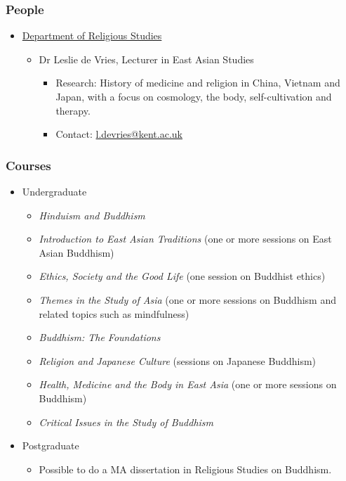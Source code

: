 \documentclass[11pt]{article}
\begin{document}
\subsubsection*{People}
\label{sec:orgacb9ae2}
\begin{itemize}
\item \href{https://www.kent.ac.uk/religious-studies/}{Department of Religious Studies}
\label{sec:org237601c}
\begin{itemize}
\item Dr Leslie de Vries, Lecturer in East Asian Studies
\label{sec:orgf307879}
\begin{itemize}
\item Research: History of medicine and religion in China, Vietnam and Japan, with a focus on cosmology, the body, self-cultivation and therapy.\\
\item Contact: \href{mailto:l.devries@kent.ac.uk}{l.devries@kent.ac.uk}\\
\end{itemize}
\end{itemize}
\end{itemize}
\subsubsection*{Courses}
\label{sec:orgd78de2b}
\begin{itemize}
\item Undergraduate
\label{sec:org9d20733}
\begin{itemize}
\item \emph{Hinduism and Buddhism}\\
\item \emph{Introduction to East Asian Traditions} (one or more sessions on East Asian Buddhism)\\
\item \emph{Ethics, Society and the Good Life} (one session on Buddhist ethics)\\
\item \emph{Themes in the Study of Asia} (one or more sessions on Buddhism and related topics such as mindfulness)\\
\item \emph{Buddhism: The Foundations}\\
\item \emph{Religion and Japanese Culture} (sessions on Japanese Buddhism)\\
\item \emph{Health, Medicine and the Body in East Asia} (one or more sessions on Buddhism)\\
\item \emph{Critical Issues in the Study of Buddhism}\\
\end{itemize}
\item Postgraduate
\label{sec:org4a8c8d6}
\begin{itemize}
\item Possible to do a MA dissertation in Religious Studies on Buddhism.\\
\end{itemize}
\end{itemize}
\end{document}
